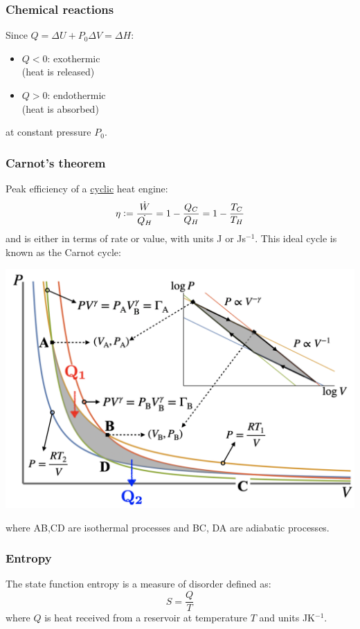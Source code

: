 \documentclass{article}
\newcommand{\deq}{\vcentcolon=}
\begin{document}
\begin{multicols*}{3}
\subsubsection*{Chemical reactions}
Since
$Q=\Delta U+P_0\Delta V=\Delta H$:
\begin{itemize}
    \item $Q<0$: exothermic \\
    (heat is released)
    \item $Q>0$: endothermic \\
    (heat is absorbed)
\end{itemize}
at constant pressure $P_0$.

\subsubsection*{Carnot's theorem}
Peak efficiency of a \underline{cyclic}
heat engine:
$$\eta\deq\frac{\dot{W}}{\dot{Q_H}}=1-\frac{Q_C}{Q_H}
=1-\frac{T_C}{T_H}$$
and is either in terms of rate or value, 
with units J or Js$^{-1}$.
This ideal cycle is known as
the Carnot cycle:
\begin{center}
    \includegraphics*[scale=0.22]{f0.png}
\end{center}
where AB,CD are isothermal processes
and BC, DA are adiabatic processes.

\subsubsection*{Entropy}
The state function entropy is a measure
of disorder defined as:
$$S=\frac{Q}{T}$$
where $Q$ is heat received from a reservoir
at temperature $T$
and units JK$^{-1}$.


\end{multicols*}
\end{document}
